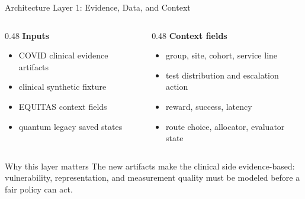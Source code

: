 \documentclass[aspectratio=169,10pt]{beamer}
\begin{document}
\begin{frame}{Architecture Layer 1: Evidence, Data, and Context}
\begin{columns}[T]
\begin{column}{0.48\textwidth}
\textbf{Inputs}
\begin{itemize}
    \item COVID clinical evidence artifacts
    \item clinical synthetic fixture
    \item EQUITAS context fields
    \item quantum legacy saved states
\end{itemize}
\end{column}
\begin{column}{0.48\textwidth}
\textbf{Context fields}
\begin{itemize}
    \item group, site, cohort, service line
    \item test distribution and escalation action
    \item reward, success, latency
    \item route choice, allocator, evaluator state
\end{itemize}
\end{column}
\end{columns}
\begin{block}{Why this layer matters}
The new artifacts make the clinical side evidence-based: vulnerability, representation, and measurement quality must be modeled before a fair policy can act.
\end{block}
\end{frame}
\end{document}
